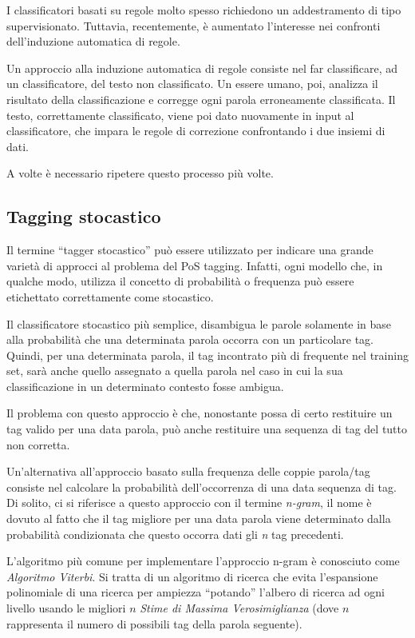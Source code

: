 I classificatori basati su regole molto spesso richiedono un addestramento di
tipo supervisionato. Tuttavia, recentemente, \`e aumentato l'interesse nei
confronti dell'induzione automatica di regole.

Un approccio alla induzione automatica di regole consiste nel far classificare,
ad un classificatore, del testo non classificato. Un essere umano, poi, analizza
il risultato della classificazione e corregge ogni parola erroneamente classificata.
Il testo, correttamente classificato, viene poi dato nuovamente in input al
classificatore, che impara le regole di correzione confrontando i due insiemi di
dati.

A volte \`e necessario ripetere questo processo pi\`u volte.

\subsection{Tagging stocastico}

Il termine ``tagger stocastico'' pu\`o essere utilizzato per indicare una grande
variet\`a di approcci al problema del PoS tagging. Infatti, ogni modello che, in
qualche modo, utilizza il concetto di probabilit\`a o frequenza pu\`o essere
etichettato correttamente come stocastico.

Il classificatore stocastico pi\`u semplice, disambigua le parole solamente in
base alla probabilit\`a che una determinata parola occorra con un particolare tag.
Quindi, per una determinata parola, il tag incontrato pi\`u di frequente nel
training set, sar\`a anche quello assegnato a quella parola nel caso in cui la
sua classificazione in un determinato contesto fosse ambigua.

Il problema con questo approccio \`e che, nonostante possa di certo restituire
un tag valido per una data parola, pu\`o anche restituire una sequenza di tag del
tutto non corretta.

Un'alternativa all'approccio basato sulla frequenza delle coppie parola/tag
consiste nel calcolare la probabilit\`a dell'occorrenza di una data sequenza di
tag. Di solito, ci si riferisce a questo approccio con il termine \emph{n-gram},
il nome \`e dovuto al fatto che il tag migliore per una data parola viene
determinato dalla probabilit\`a condizionata che questo occorra dati gli \emph{n}
tag precedenti.

L'algoritmo pi\`u comune per implementare l'approccio n-gram \`e conosciuto come
\emph{Algoritmo Viterbi}. Si tratta di un algoritmo di ricerca che evita
l'espansione polinomiale di una ricerca per ampiezza ``potando'' l'albero di
ricerca ad ogni livello usando le migliori $n$ \emph{Stime di Massima Verosimiglianza}
(dove $n$ rappresenta il numero di possibili tag della parola seguente).

